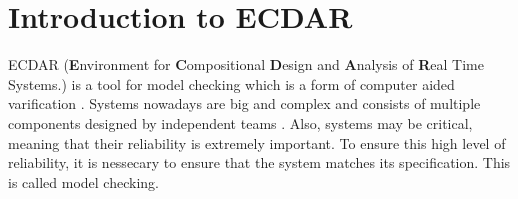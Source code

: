 \section{Introduction to ECDAR}\label{sec:introduction-to-ecdar}
\commondisclaimer

ECDAR (\textbf{E}nvironment for \textbf{C}ompositional \textbf{D}esign and \textbf{A}nalysis of \textbf{R}eal Time Systems.)
 is a tool for model checking \cite{ecdartheory} which is a form of computer aided varification \cite{modelchecking_handbook}.
Systems nowadays are big and complex and consists of multiple components designed by independent teams \cite{ecdartheory}. 
Also, systems may be critical, meaning that their reliability is extremely important. 
To ensure this high level of reliability, it is nessecary to ensure that the system matches its specification.
This is called model checking.
